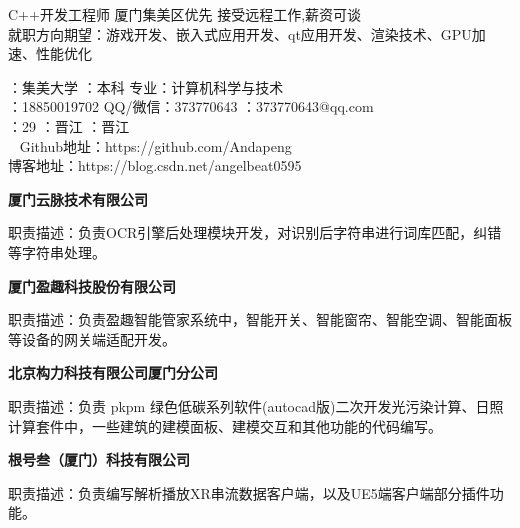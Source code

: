 \documentclass{resume} %
\begin{document}

\begin{rSection}{}
	C++开发工程师 \qquad\faBuildingO 厦门集美区优先 \qquad 接受远程工作,薪资可谈 \\
	就职方向期望：游戏开发、嵌入式应用开发、qt应用开发、渲染技术、GPU加速、性能优化
\end{rSection}


\begin{rSection}{}
	：集美大学 \qquad \qquad{}：本科 \qquad \quad 专业：计算机科学与技术\\
	\qquad {}：18850019702 \qquad \faComments QQ/微信：373770643  \qquad {}：373770643@qq.com \\
	：29 \qquad {}：晋江	\qquad {}：晋江 \\
     \faGithubAlt~ Github地址：https://github.com/Andapeng\\
	\faLink 博客地址：https://blog.csdn.net/angelbeat0595
	
	
\end{rSection}



\begin{rSection}{}

\textbf{厦门云脉技术有限公司}\qquad\qquad{}\qquad\qquad{}
\item	职责描述：负责OCR引擎后处理模块开发，对识别后字符串进行词库匹配，纠错等字符串处理。


\textbf{厦门盈趣科技股份有限公司}\qquad\qquad{}\qquad\qquad{}
\item	职责描述：负责盈趣智能管家系统中，智能开关、智能窗帘、智能空调、智能面板等设备的网关端适配开发。

\textbf{北京构力科技有限公司厦门分公司}\qquad\qquad{}\qquad\qquad{}
\item	职责描述：负责 pkpm 绿色低碳系列软件(autocad版)二次开发光污染计算、日照计算套件中，一些建筑的建模面板、建模交互和其他功能的代码编写。

\textbf{根号叁（厦门）科技有限公司}\qquad\qquad{}\qquad\qquad{}
\item	职责描述：负责编写解析播放XR串流数据客户端，以及UE5端客户端部分插件功能。

\end{rSection}
\end{document}
